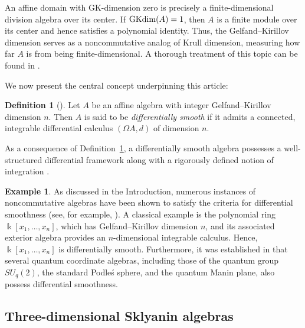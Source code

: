 \documentclass{amsart}
\theoremstyle{definition}
\newtheorem{definition}[theorem]{Definition}
\newtheorem{example}[theorem]{Example}
\theoremstyle{remark}
\numberwithin{equation}{section}
\begin{document}
An affine domain with GK-dimension zero is precisely a finite-dimensional division algebra over its center. If ${\rm GKdim}(A) = 1$, then $A$ is a finite module over its center and hence satisfies a polynomial identity. Thus, the Gelfand–Kirillov dimension serves as a noncommutative analog of Krull dimension, measuring how far $A$ is from being finite-dimensional. A thorough treatment of this topic can be found in \cite{KrauseLenagan2000}.

We now present the central concept underpinning this article:

\begin{definition}[{\cite[Definition 2.4]{BrzezinskiSitarz2017}}]\label{BrzezinskiSitarz2017Definition2.4}
Let $A$ be an affine algebra with integer Gelfand–Kirillov dimension $n$. Then $A$ is said to be {\em differentially smooth} if it admits a connected, integrable differential calculus $(\Omega A, d)$ of dimension $n$.
\end{definition}

As a consequence of Definition~\ref{BrzezinskiSitarz2017Definition2.4}, a differentially smooth algebra possesses a well-structured differential framework along with a rigorously defined notion of integration \cite[p.~2414]{BrzezinskiLomp2018}.

\begin{example}
As discussed in the Introduction, numerous instances of noncommutative algebras have been shown to satisfy the criteria for differential smoothness (see, for example, \cite{Brzezinski2015, BrzezinskiElKaoutitLomp2010, BrzezinskiLomp2018, BrzezinskiSitarz2017, Karacuha2015, KaracuhaLomp2014, ReyesSarmiento2022}). A classical example is the polynomial ring $\Bbbk[x_1, \dotsc, x_n]$, which has Gelfand–Kirillov dimension $n$, and its associated exterior algebra provides an $n$-dimensional integrable calculus. Hence, $\Bbbk[x_1, \dotsc, x_n]$ is differentially smooth. Furthermore, it was established in \cite{BrzezinskiElKaoutitLomp2010} that several quantum coordinate algebras, including those of the quantum group $SU_q(2)$, the standard Podleś sphere, and the quantum Manin plane, also possess differential smoothness.
\end{example}


\subsection{Three-dimensional Sklyanin algebras}\label{threeSkly}
\end{document}
